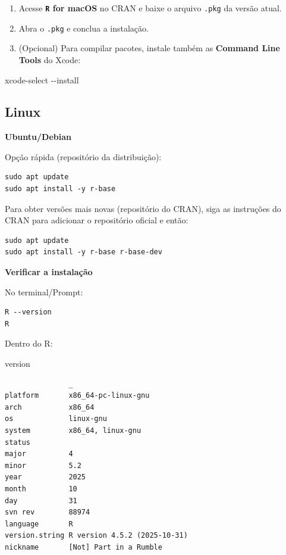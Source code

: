 \documentclass[
  letterpaper,
  DIV=11,
  numbers=noendperiod]{scrreprt}
\newenvironment{Shaded}{\begin{snugshade}}{\end{snugshade}}
\newcommand{\AttributeTok}[1]{\textcolor[rgb]{0.40,0.45,0.13}{#1}}
\newcommand{\ExtensionTok}[1]{\textcolor[rgb]{0.00,0.23,0.31}{#1}}
\newcommand{\NormalTok}[1]{\textcolor[rgb]{0.00,0.23,0.31}{#1}}
\begin{document}
\begin{enumerate}
\def\labelenumi{\arabic{enumi}.}
\item
  Acesse \textbf{\texttt{R} for macOS} no CRAN e baixe o arquivo
  \texttt{.pkg} da versão atual.
\item
  Abra o \texttt{.pkg} e conclua a instalação.
\item
  (Opcional) Para compilar pacotes, instale também as \textbf{Command
  Line Tools} do Xcode:
\end{enumerate}

\begin{Shaded}
\begin{Highlighting}[]
\ExtensionTok{xcode{-}select} \AttributeTok{{-}{-}install}
\end{Highlighting}
\end{Shaded}

\subsection*{Linux}\label{linux}

\textbf{Ubuntu/Debian}

Opção rápida (repositório da distribuição):

\begin{verbatim}
sudo apt update
sudo apt install -y r-base
\end{verbatim}

Para obter versões mais novas (repositório do CRAN), siga as instruções
do CRAN para adicionar o repositório oficial e então:

\begin{verbatim}
sudo apt update
sudo apt install -y r-base r-base-dev
\end{verbatim}

\textbf{Verificar a instalação}

No terminal/Prompt:

\begin{verbatim}
R --version
R
\end{verbatim}

Dentro do R:

\begin{Shaded}
\begin{Highlighting}[]
\NormalTok{version}
\end{Highlighting}
\end{Shaded}

\begin{verbatim}
               _                           
platform       x86_64-pc-linux-gnu         
arch           x86_64                      
os             linux-gnu                   
system         x86_64, linux-gnu           
status                                     
major          4                           
minor          5.2                         
year           2025                        
month          10                          
day            31                          
svn rev        88974                       
language       R                           
version.string R version 4.5.2 (2025-10-31)
nickname       [Not] Part in a Rumble      
\end{verbatim}
\end{document}
